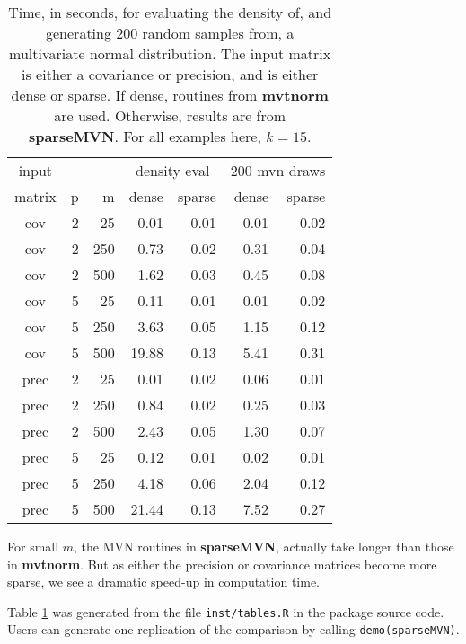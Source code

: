 \documentclass[11pt]{article}
\newcommand{\pkg}[1]{\textbf{#1}}
\newcommand{\file}[1]{\texttt{#1}}
\begin{document}
\begin{table}[ht]
\centering
\begin{tabular}{crr|rr|rr}
input&&&\multicolumn{2}{|c}{density eval}&\multicolumn{2}{|c}{200 mvn draws}\\
  matrix  & p & m & dense & sparse & dense & sparse \\ 
  \hline
 cov  & 2 & 25 & 0.01 & 0.01 & 0.01 & 0.02 \\ 
 cov  & 2 & 250 & 0.73 & 0.02 & 0.31 & 0.04 \\ 
  cov  & 2 & 500 & 1.62 & 0.03 & 0.45 & 0.08 \\ 
  cov  & 5 & 25 & 0.11 & 0.01 & 0.01 & 0.02 \\ 
  cov  & 5 & 250 & 3.63 & 0.05 & 1.15 & 0.12 \\ 
  cov  & 5 & 500 & 19.88 & 0.13 & 5.41 & 0.31 \\ 
  prec & 2 & 25 & 0.01 & 0.02 & 0.06 & 0.01 \\ 
  prec  & 2 & 250 & 0.84 & 0.02 & 0.25 & 0.03 \\ 
  prec  & 2 & 500 & 2.43 & 0.05 & 1.30 & 0.07 \\ 
  prec  & 5 & 25 & 0.12 & 0.01 & 0.02 & 0.01 \\ 
  prec  & 5 & 250 & 4.18 & 0.06 & 2.04 & 0.12 \\ 
  prec  & 5 & 500 & 21.44 & 0.13 & 7.52 & 0.27 \\ 
\end{tabular}
\caption{Time, in seconds, for evaluating the density of, and generating 200 random samples from, a multivariate normal distribution.  The input matrix is either a covariance or precision, and is either dense or sparse.  If dense, routines from \pkg{mvtnorm} are used.  Otherwise, results are from \pkg{sparseMVN}.  For all examples here, $k=15$.}
\label{tab:times}
\end{table}

For small $m$, the MVN routines in \pkg{sparseMVN}, actually take longer than those in \pkg{mvtnorm}.  But as either the precision or covariance matrices become more sparse, we see a dramatic speed-up in computation time.

Table \ref{tab:times} was generated from the file \file{inst/tables.R} in the package source code.  Users can generate one replication of the comparison by calling \texttt{demo(sparseMVN)}.

\FloatBarrier


\end{document}
